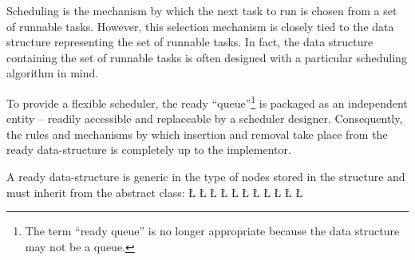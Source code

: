 \documentclass[openright,twoside]{report}
\begin{document}
Scheduling is the mechanism by which the next task to run is chosen from a set of runnable tasks.
However, this selection mechanism is closely tied to the data structure representing the set of runnable tasks.
In fact, the data structure containing the set of runnable tasks is often designed with a particular scheduling algorithm in mind.

To provide a flexible scheduler, the ready ``queue''\footnote{The term ``ready queue'' is no longer appropriate because the data structure may not be a queue.} is packaged as an independent entity -- readily accessible and replaceable by a scheduler designer.
Consequently, the rules and mechanisms by which insertion and removal take place from the ready data-structure is completely up to the implementor.

A ready data-structure is generic in the type of nodes stored in the structure and must inherit from the abstract class:
\LGinlinefalse\LGbegin\lgrinde
\L{}
\L{}
\L{\LB{}}
\L{\LB{}}
\L{\LB{}}
\L{\LB{}}
\L{\LB{}}
\L{\LB{}}
\L{\LB{}}
\L{\LB{}}
\L{\LB{\};}}
\endlgrinde\LGend
{}%
%
%
%
\end{document}
